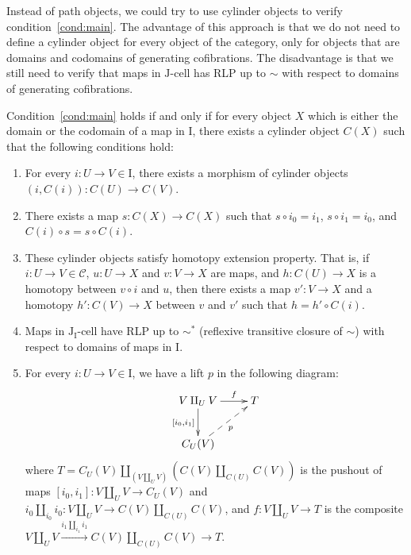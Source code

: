 \documentclass{tac}
\theoremstyle{definition}
\newcommand{\cof}{\mathcal{C}}
\newcommand{\I}{\mathrm{I}}
\newcommand{\J}{\mathrm{J}}
\newcommand{\class}[2]{#1\text{-}\mathrm{#2}}
\newcommand{\Icell}[1][\I]{\class{#1}{cell}}
\newcommand{\Jcell}[1][]{\Icell[\J#1]}
\newcommand{\cyli}{i}
\begin{document}
Instead of path objects, we could try to use cylinder objects to verify condition~\eqref{cond:main}.
The advantage of this approach is that we do not need to define a cylinder object for every object of the category,
only for objects that are domains and codomains of generating cofibrations.
The disadvantage is that we still need to verify that maps in $\Jcell$ has RLP up to $\sim$ with respect to domains of generating cofibrations.

\begin{prop}
Condition~\eqref{cond:main} holds if and only if for every object $X$ which is either the domain or the codomain of a map in $\I$,
there exists a cylinder object $C(X)$ such that the following conditions hold:
\begin{enumerate}
\item For every $i : U \to V \in \I$, there exists a morphism of cylinder objects $(i,C(i)) : C(U) \to C(V)$.
\item There exists a map $s : C(X) \to C(X)$ such that $s \circ i_0 = i_1$, $s \circ i_1 = i_0$, and $C(i) \circ s = s \circ C(i)$.
\item These cylinder objects satisfy homotopy extension property. That is,
if $i : U \to V \in \cof$, $u : U \to X$ and $v : V \to X$ are maps, and $h : C(U) \to X$ is a homotopy between $v \circ i$ and $u$,
then there exists a map $v' : V \to X$ and a homotopy $h' : C(V) \to X$ between $v$ and $v'$ such that $h = h' \circ C(i)$.
\item Maps in $\Jcell[_\I]$ have RLP up to $\sim^*$ (reflexive transitive closure of $\sim$) with respect to domains of maps in $\I$.
\item For every $i : U \to V \in \I$, we have a lift $p$ in the following diagram:
\[ \xymatrix{ V \amalg_U V \ar[r]^-f \ar[d]_{[\cyli_0,\cyli_1]} & T \\
              C_U(V) \ar@{-->}[ur]_p
            } \]
where $T = C_U(V) \amalg_{(V \amalg_U V)} (C(V) \amalg_{C(U)} C(V))$ is the pushout of maps $[\cyli_0,\cyli_1] : V \amalg_U V \to C_U(V)$
and $\cyli_0 \amalg_{\cyli_0} \cyli_0 : V \amalg_U V \to C(V) \amalg_{C(U)} C(V)$,
and $f : V \amalg_U V \to T$ is the composite $V \amalg_U V \xrightarrow{\cyli_1 \amalg_{\cyli_1} \cyli_1} C(V) \amalg_{C(U)} C(V) \to T$.
\end{enumerate}
\end{prop}
\end{document}
